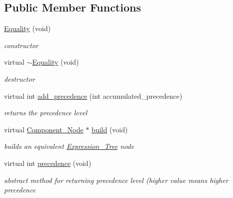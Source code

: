 \subsection*{Public Member Functions}
\begin{DoxyCompactItemize}
\item 
\hyperlink{classMadara_1_1Expression__Tree_1_1Equality_aa21b4e47df18b044b4eb3ff0cf10d5c5}{Equality} (void)
\begin{DoxyCompactList}\small\item\em constructor \item\end{DoxyCompactList}\item 
virtual \hyperlink{classMadara_1_1Expression__Tree_1_1Equality_a306dced431b079db7b2083f3aa33d417}{$\sim$Equality} (void)
\begin{DoxyCompactList}\small\item\em destructor \item\end{DoxyCompactList}\item 
virtual int \hyperlink{classMadara_1_1Expression__Tree_1_1Equality_aff0c7d679eaeed23dedc09e5ebb745cd}{add\_\-precedence} (int accumulated\_\-precedence)
\begin{DoxyCompactList}\small\item\em returns the precedence level \item\end{DoxyCompactList}\item 
virtual \hyperlink{classMadara_1_1Expression__Tree_1_1Component__Node}{Component\_\-Node} $\ast$ \hyperlink{classMadara_1_1Expression__Tree_1_1Equality_a0afb5fc6a7e6259e2d2d06b429f2890e}{build} (void)
\begin{DoxyCompactList}\small\item\em builds an equivalent \hyperlink{classMadara_1_1Expression__Tree_1_1Expression__Tree}{Expression\_\-Tree} node \item\end{DoxyCompactList}\item 
virtual int \hyperlink{classMadara_1_1Expression__Tree_1_1Symbol_ac060dedb8d16864591b259df375109b3}{precedence} (void)
\begin{DoxyCompactList}\small\item\em abstract method for returning precedence level (higher value means higher precedence \item\end{DoxyCompactList}\end{DoxyCompactItemize}
